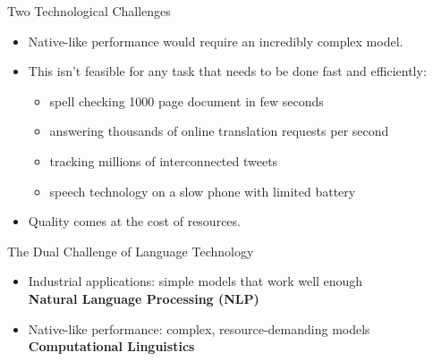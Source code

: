 \documentclass[xcolor={usenames,svgnames,x11names,dvipsnames,table}]{beamer}
\begin{document}
\begin{frame}{Two Technological Challenges}
    \begin{itemize}
        \item Native-like performance would require an incredibly complex model.
        \item This isn't feasible for any task that needs to be done fast and efficiently:
            \begin{itemize}
                \item spell checking 1000 page document in few seconds
                \item answering thousands of online translation requests per second
                \item tracking millions of interconnected tweets
                \item speech technology on a slow phone with limited battery
            \end{itemize}
        \item Quality comes at the cost of resources.
    \end{itemize}

    \pause
    \begin{block}{The Dual Challenge of Language Technology}
        \begin{itemize}
            \item Industrial applications: simple models that work well enough\\
                \textbf{Natural Language Processing (NLP)}
            \item Native-like performance: complex, resource-demanding models\\
                \textbf{Computational Linguistics}
        \end{itemize}
    \end{block}
\end{frame}
\end{document}
